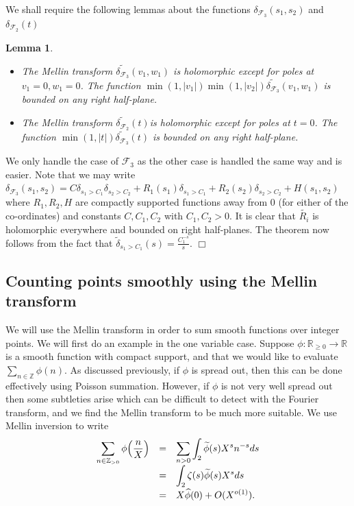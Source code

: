\documentclass{article}
\def\Z{{\mathbb Z}}
\def\R{{\mathbb R}}
\def\FF{{\mathcal F}}
\def\Z{{\mathbb Z}}
\def\wt{\widetilde}
\newtheorem{lemma}[theorem]{Lemma}
\newenvironment{proof}{\noindent {\bf Proof:}}{$\Box$ \vspace{2 ex}}
\begin{document}
We shall require the following lemmas about the functions $\delta_{\FF_3}(s_1,s_2)$ and $\delta_{\FF_2}(t)$

\begin{lemma}\label{lem:mellinbounddelta}
\begin{itemize}
    \item The Mellin transform $\wt{\delta_{\FF_3}}(v_1,w_1)$ is holomorphic except for poles at $v_1=0,w_1=0$.  The function $\min(1,|v_1|)\min(1,|v_2|)\wt{\delta_{\FF_3}}(v_1,w_1)$ is bounded on any right half-plane.
    \item  The Mellin transform $\wt{\delta_{\FF_2}}(t)$is holomorphic except for poles at $t=0$.  The function $\min(1,|t|)\wt{\delta_{\FF_3}}(t)$ is bounded on any right half-plane.
\end{itemize}
\end{lemma}

\begin{proof}
    We only handle the case of $\FF_3$ as the other case is handled the same way and is easier. Note that we may write $\delta_{\FF_3}(s_1,s_2) = C\delta_{s_1>C_1}\delta_{s_2>C_2}+R_1(s_1)\delta_{s_1>C_1}+R_2(s_2)\delta_{s_2>C_2}+H(s_1,s_2)$ where $R_1,R_2,H$ are compactly supported functions away from $0$ (for either of the co-ordinates) and constants $C,C_1,C_2$ with $C_1,C_2>0$. It is clear that $\tilde{R_i}$ is holomorphic everywhere and bounded on right half-planes. The theorem now follows from the fact that $\tilde{\delta}_{s_
    1>C_1}(s)=\frac{C_1^{-s}}{s}.$
\end{proof}


\subsection{Counting points smoothly using the Mellin transform}\label{sec:poissonexample}

We will use the Mellin transform in order to sum smooth functions over integer points. We will first do an example in the one variable case.
Suppose $\phi:\R_{\geq 0}\to\R$ is a smooth function with compact support, and that we would like to evaluate $\sum_{n\in\Z} \phi(n)$. 
As discussed previously, if $\phi$ is spread out, then this can be done effectively using Poisson summation. However, if $\phi$ is not very well spread out then some subtleties arise which can be difficult to detect with the Fourier transform, and we find the Mellin transform to be much more suitable. We use Mellin inversion to write
\begin{equation*}
\begin{array}{rcl}
\displaystyle\sum_{n\in\Z_{>0}}\phi\Bigl(\frac{n}{X}\Bigr) &=&\displaystyle
\sum_{n>0}\int_{2}\wt{\phi}(s)X^sn^{-s}ds
\\[.1in]&=&\displaystyle
\int_{2} \zeta(s)\wt{\phi}(s)X^sds
\\[.1in]&=&\displaystyle 
X\widehat{\phi}(0)+O(X^{o(1)}).
\end{array}
\end{equation*}
\end{document}
